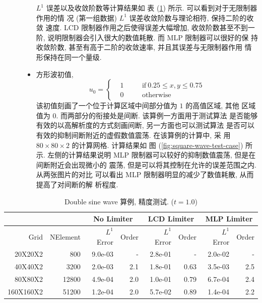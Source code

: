 \begin{description}
\begin{itemize}
    $L^{1}$ 误差以及收敛阶数等计算结果如
    表 (\ref{tb:accuracy-test}) 所示. 可以看到对于无限制器作用的情
    况 (第一组数据) $L^{1}$ 误差收敛阶数与理论相符, 保持二阶的收敛
    速度. LCD 限制器作用之后使得误差大幅增加, 收敛阶数甚至不到一
    阶, 说明限制器会引入很大的数值耗散. 而 MLP 限制器可以很好的保
    持收敛阶数, 甚至有高于二阶的收敛速率, 并且其误差与无限制器作用
    情形保持在同一个量级.
  \item 方形波初值,
    \begin{equation}
      \label{eq:square-wave-test-case}
      u_{0} = \left\{
        \begin{aligned}
          &1 &\quad & \mbox{if}~ 0.25 \le x,y \le 0.75\\
          &0 &\quad & \mbox{otherwise}
        \end{aligned}
      \right.
    \end{equation}
    该初值刻画了一个位于计算区域中间部分值为 $1$ 的高值区域, 其他
    区域值为 $0$. 而两部分的衔接处是间断. 该算例一方面用于测试算法
    是否能够有效的以高解析度的方式刻画间断, 另一方面也可以测试算法
    是否可以有效的抑制间断附近的虚假数值震荡. 在该算例的计算中, 采
    用 $80 \times 80 \times 2$ 的计算网格. 计算结果如
    图 (\ref{fig:square-wave-test-case}) 所示. 左侧的计算结果说明
    MLP 限制器可以较好的抑制数值震荡, 但是在间断附近会出现微小的
    震荡, 但是可以将其控制在允许的误差范围之内. 从两张图片的对比
    可以看出 MLP 限制器明显的减少了数值耗散, 从而提高了对间断的解
    析程度.
  \end{itemize}
\end{description}
\begin{center}
  \scriptsize
  \begin{table}
    \begin{tabular}{rrrr|rr|rr}
      &            & \multicolumn{2}{c}{No Limiter} &
      \multicolumn{2}{c}{LCD Limiter} & \multicolumn{2}{c}{MLP Limiter} \\
      \hline
      Grid  &  NElement  &    $L^{1}$ Error  &  Order  &  $L^{1}$ Error  &  Order  &   $L^{1}$ Error  &  Order  \\
      \hline
      20X20X2  &       800  &     9.0e-03  &      -  &      2.8e-01  &      -  &      2.0e-02  &      -  \\
      40X40X2  &      3200  &     2.0e-03  &    2.1  &      1.8e-01  &   0.63  &      3.5e-03  &    2.5  \\
      80X80X2  &     12800  &     4.9e-04  &    2.0  &      1.0e-01  &   0.79  &      6.7e-04  &    2.4  \\
      160X160X2  &     51200  &     1.2e-04  &    2.0  &      5.7e-02  &   0.89  &      1.4e-04  &    2.2  \\
      \hline
    \end{tabular}
    \caption{Double sine wave 算例, 精度测试. ($t=1.0$)}
    \label{tb:accuracy-test}
  \end{table}
\end{center}
